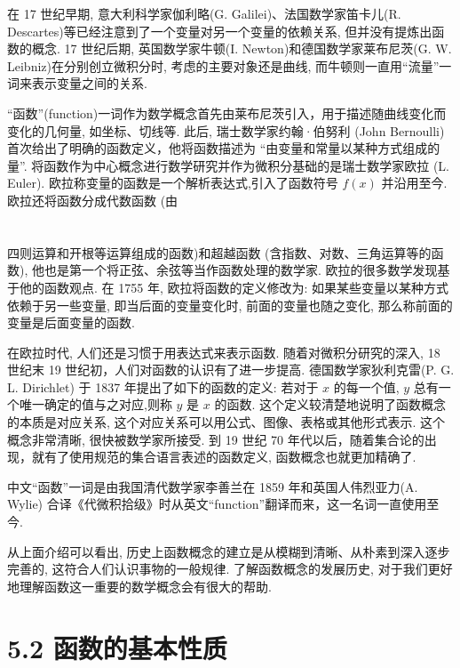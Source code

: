 \documentclass[10pt]{article}
\begin{document}
在 17 世纪早期, 意大利科学家伽利略(G. Galilei)、法国数学家笛卡儿(R. Descartes)等已经注意到了一个变量对另一个变量的依赖关系, 但并没有提炼出函数的概念. 17 世纪后期, 英国数学家牛顿(I. Newton)和德国数学家莱布尼茨(G. W. Leibniz)在分别创立微积分时, 考虑的主要对象还是曲线, 而牛顿则一直用“流量”一词来表示变量之间的关系.

“函数”(function)一词作为数学概念首先由莱布尼茨引入，用于描述随曲线变化而变化的几何量, 如坐标、切线等. 此后, 瑞士数学家约翰·伯努利 (John Bernoulli) 首次给出了明确的函数定义，他将函数描述为 “由变量和常量以某种方式组成的量”. 将函数作为中心概念进行数学研究并作为微积分基础的是瑞士数学家欧拉 (L. Euler). 欧拉称变量的函数是一个解析表达式,引入了函数符号 \(f\left( x\right)\) 并沿用至今. 欧拉还将函数分成代数函数 (由



\section*{}

四则运算和开根等运算组成的函数)和超越函数 (含指数、对数、三角运算等的函数), 他也是第一个将正弦、余弦等当作函数处理的数学家. 欧拉的很多数学发现基于他的函数观点. 在 1755 年, 欧拉将函数的定义修改为: 如果某些变量以某种方式依赖于另一些变量, 即当后面的变量变化时, 前面的变量也随之变化, 那么称前面的变量是后面变量的函数.

在欧拉时代, 人们还是习惯于用表达式来表示函数. 随着对微积分研究的深入, 18 世纪末 19 世纪初，人们对函数的认识有了进一步提高. 德国数学家狄利克雷(P. G. L. Dirichlet) 于 1837 年提出了如下的函数的定义: 若对于 \(x\) 的每一个值, \(y\) 总有一个唯一确定的值与之对应,则称 \(y\) 是 \(x\) 的函数. 这个定义较清楚地说明了函数概念的本质是对应关系, 这个对应关系可以用公式、图像、表格或其他形式表示. 这个概念非常清晰, 很快被数学家所接受. 到 19 世纪 70 年代以后，随着集合论的出现，就有了使用规范的集合语言表述的函数定义, 函数概念也就更加精确了.

中文“函数”一词是由我国清代数学家李善兰在 1859 年和英国人伟烈亚力(A. Wylie) 合译《代微积拾级》时从英文“function”翻译而来，这一名词一直使用至今.

从上面介绍可以看出, 历史上函数概念的建立是从模糊到清晰、从朴素到深入逐步完善的, 这符合人们认识事物的一般规律. 了解函数概念的发展历史, 对于我们更好地理解函数这一重要的数学概念会有很大的帮助.

\section*{5.2 函数的基本性质}
\end{document}
